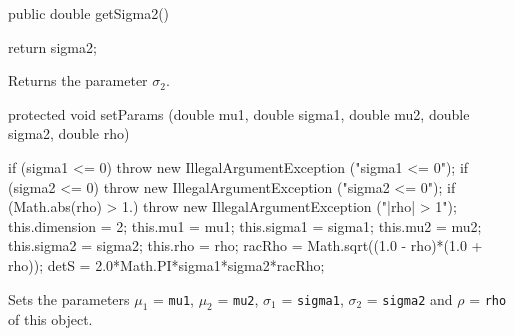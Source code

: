 \begin{code}

   public double getSigma2() \begin{hide} {
      return sigma2;
   }\end{hide}
\end{code}
\begin{tabb} Returns the parameter $\sigma_2$.
\end{tabb}
\begin{code}

   protected void setParams (double mu1, double sigma1, 
                             double mu2, double sigma2, double rho) \begin{hide} {
      if (sigma1 <= 0)
         throw new IllegalArgumentException ("sigma1 <= 0");
      if (sigma2 <= 0)
         throw new IllegalArgumentException ("sigma2 <= 0");
      if (Math.abs(rho) > 1.)
         throw new IllegalArgumentException ("|rho| > 1");
      this.dimension = 2;
      this.mu1 = mu1;
      this.sigma1 = sigma1;
      this.mu2 = mu2;
      this.sigma2 = sigma2;
      this.rho = rho; 
      racRho = Math.sqrt((1.0 - rho)*(1.0 + rho));
      detS = 2.0*Math.PI*sigma1*sigma2*racRho;
   }\end{hide}
\end{code}
  \begin{tabb} Sets the parameters  $\mu_1$ = \texttt{mu1},
 $\mu_2$ = \texttt{mu2}, $\sigma_1$ = \texttt{sigma1},  $\sigma_2$ = 
  \texttt{sigma2} and $\rho$ = \texttt{rho} of this object.
  \end{tabb}
\begin{code}\begin{hide} 
}\end{hide}
\end{code}
